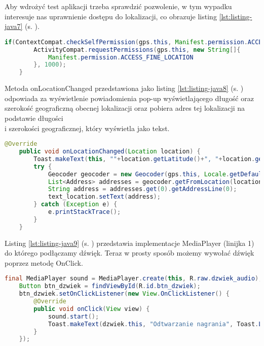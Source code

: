 Aby wdrożyć test aplikacji trzeba sprawdzić pozwolenie, w tym wypadku interesuje nas uprawnienie dostępu do lokalizacji, co obrazuje listing  \ref{lst:listing-java7} (s. \pageref{lst:listing-java7}). 
\begin{lstlisting}[caption=GPS - Dostęp do lokazlizacji, label={lst:listing-java7}, language=Java]
	if(ContextCompat.checkSelfPermission(gps.this, Manifest.permission.ACCESS_FINE_LOCATION) != PackageManager.PERMISSION_GRANTED) {
		ActivityCompat.requestPermissions(gps.this, new String[]{
			Manifest.permission.ACCESS_FINE_LOCATION
		}, 1000);
	}
\end{lstlisting}

\newpage


Metoda onLocationChanged przedstawiona jako listing \ref{lst:listing-java8} (s. \pageref{lst:listing-java8}) odpowiada za wyświetlenie powiadomienia pop-up wyświetlającego długość oraz szerokość geograficzną obecnej lokalizacji oraz pobiera adres tej lokalizacji na podstawie długości \\ i szerokości geograficznej, który wyświetla jako tekst.
\begin{lstlisting}[caption=GPS - Wyświetlanie lokalizacji, label={lst:listing-java8}, language=Java]
	@Override
	public void onLocationChanged(Location location) {
		Toast.makeText(this, ""+location.getLatitude()+", "+location.getLongitude(), Toast.LENGTH_SHORT).show();
		try {
			Geocoder geocoder = new Geocoder(gps.this, Locale.getDefault());
			List<Address> addresses = geocoder.getFromLocation(location.getLatitude(), location.getLongitude(), 1);
			String address = addresses.get(0).getAddressLine(0);
			text_location.setText(address);
		} catch (Exception e) {
			e.printStackTrace();
		}
	}
\end{lstlisting}


Listing \ref{lst:listing-java9} (s. \pageref{lst:listing-java9}) przedstawia implementacje MediaPlayer (linijka 1) do którego podłączamy dźwięk. Teraz w prosty sposób możemy wywołać dźwięk poprzez metodę OnClick.
\begin{lstlisting}[caption= Dźwięk - Działanie z wykorzystaniem MediaPlayer, label={lst:listing-java9}, language=Java]
	final MediaPlayer sound = MediaPlayer.create(this, R.raw.dzwiek_audio);
	Button btn_dzwiek = findViewById(R.id.btn_dzwiek);
	btn_dzwiek.setOnClickListener(new View.OnClickListener() {
		@Override
		public void onClick(View view) {
			sound.start();
			Toast.makeText(dzwiek.this, "Odtwarzanie nagrania", Toast.LENGTH_SHORT).show();
		}
	});
\end{lstlisting}

